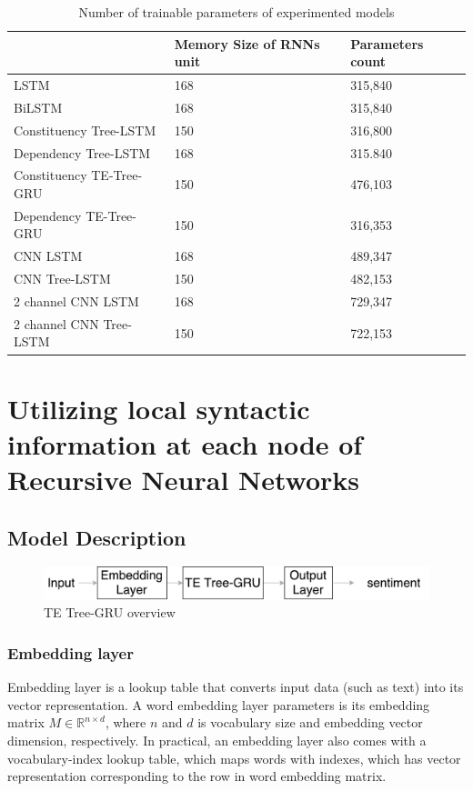 \begin{table}[H]
    \centering
    \caption{Number of trainable parameters of experimented models}
    \label{table:paramtable}
    \begin{tabular}{lll}
        ~ & Memory Size of RNNs unit & Parameters count \\ \hline
        LSTM                     & 168         & 315,840          \\
        BiLSTM                   & 168         & 315,840          \\
        Constituency Tree-LSTM   & 150         & 316,800          \\
        Dependency Tree-LSTM     & 168         & 315.840          \\
        Constituency TE-Tree-GRU & 150         & 476,103          \\
        Dependency TE-Tree-GRU   & 150         & 316,353          \\
        CNN LSTM                 & 168         & 489,347          \\
        CNN Tree-LSTM            & 150         & 482,153          \\
        2 channel CNN LSTM       & 168         & 729,347          \\
        2 channel CNN Tree-LSTM  & 150         & 722,153         
    \end{tabular}
\end{table}

\hypertarget{sec:VTtree}{\section{Utilizing local  syntactic information at each node of Recursive Neural Networks}}\label{sec:VTtree}
\subsection{Model Description}

\begin{figure}[H]
    \centering
    \includegraphics[width=0.8\linewidth]{figure/vtgrusummary.pdf}
    \caption[]{TE Tree-GRU overview}
    \label{fig:vtgrusummary}
\end{figure}

\subsubsection{Embedding layer}\label{sec:embedding}
Embedding layer is a lookup table that converts input data (such as text) into its vector representation. A word embedding layer parameters is its embedding matrix $M  \in \mathbb{R}^{n \times d}$, where $n$ and $d$ is vocabulary size and embedding vector dimension, respectively. In practical, an embedding layer also comes with a vocabulary-index lookup table, which maps words with indexes, which has vector representation corresponding to the row in word embedding matrix.
  

